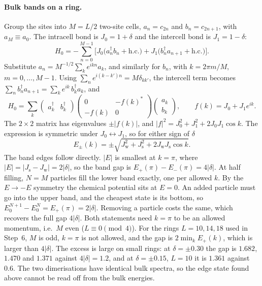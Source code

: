 \documentclass[11pt,a4paper]{article}
\newcommand{\Jw}{J_{\mathrm{w}}}
\newcommand{\Js}{J_{\mathrm{s}}}
\newcommand{\dg}{^{\dagger}}
\begin{document}
\paragraph{Bulk bands on a ring.}
Group the sites into $M=L/2$ two-site cells, $a_n = c_{2n}$ and $b_n = c_{2n+1}$, with $a_M\equiv a_0$.
The intracell bond is $J_0 = 1+\delta$ and the intercell bond is $J_1 = 1-\delta$:
\begin{equation}
  H_0 = -\sum_{n=0}^{M-1}\Big[J_0\big(a_n\dg b_n + \text{h.c.}\big) + J_1\big(b_n\dg a_{n+1} + \text{h.c.}\big)\Big].
\end{equation}
Substitute $a_n = M^{-1/2}\sum_k e^{ikn}a_k$, and similarly for $b_n$, with $k = 2\pi m/M$, $m = 0,\dots,M-1$.
Using $\sum_n e^{i(k-k')n} = M\delta_{kk'}$, the intercell term becomes $\sum_n b_n\dg a_{n+1} = \sum_k e^{ik}\,b_k\dg a_k$, and
\begin{equation}
  H_0 = \sum_k \begin{pmatrix}a_k\dg & b_k\dg\end{pmatrix}
  \begin{pmatrix} 0 & -f(k)^* \\ -f(k) & 0 \end{pmatrix}
  \begin{pmatrix}a_k\\ b_k\end{pmatrix},
  \qquad f(k) = J_0 + J_1e^{ik}.
\end{equation}
The $2\times2$ matrix has eigenvalues $\pm|f(k)|$, and $|f|^2 = J_0^2 + J_1^2 + 2J_0J_1\cos k$.
The expression is symmetric under $J_0\leftrightarrow J_1$, so for either sign of $\delta$
\begin{equation}
  E_\pm(k) = \pm\sqrt{\Jw^2+\Js^2+2\Jw\Js\cos k}.
  \label{eq:bands}
\end{equation}
The band edges follow directly.
$|E|$ is smallest at $k=\pi$, where $|E| = |\Js-\Jw| = 2|\delta|$, so the band gap is $E_+(\pi)-E_-(\pi) = 4|\delta|$.
At half filling, $N=M$ particles fill the lower band exactly, one per allowed $k$.
By the $E\to-E$ symmetry the chemical potential sits at $E=0$.
An added particle must go into the upper band, and the cheapest state is its bottom, so $E_0^{N+1}-E_0^N = E_+(\pi) = 2|\delta|$.
Removing a particle costs the same, which recovers the full gap $4|\delta|$.
Both statements need $k=\pi$ to be an allowed momentum, i.e.\ $M$ even ($L\equiv0\pmod4$).
For the rings $L=10,14,18$ used in Step~6, $M$ is odd, $k=\pi$ is not allowed, and the gap is $2\min_k E_+(k)$, which is larger than $4|\delta|$.
The excess is large on small rings: at $\delta=\pm0.30$ the gap is $1.682$, $1.470$ and $1.371$ against $4|\delta| = 1.2$, and at $\delta=\pm0.15$, $L=10$ it is $1.361$ against $0.6$.
The two dimerisations have identical bulk spectra, so the edge state found above cannot be read off from the bulk energies.
\end{document}
